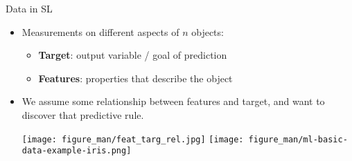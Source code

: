 \documentclass[11pt,compress,t,notes=noshow, xcolor=table]{beamer}
\begin{document}
\begin{vbframe}{Data in SL}

\begin{itemize}

  \item Measurements on different aspects of $n$ objects:
  
  \begin{itemize}
  
    \item \textbf{Target}: output variable / goal of prediction

    \item \textbf{Features}: properties that describe the object 
    

  \end{itemize}
  
  \item We assume some relationship between features and target, and want to discover that predictive rule.
  

    \texttt{[image: figure\_man/feat\_targ\_rel.jpg]}
    \texttt{[image: figure\_man/ml-basic-data-example-iris.png]} 

\end{itemize}

\end{vbframe}

\end{document}
